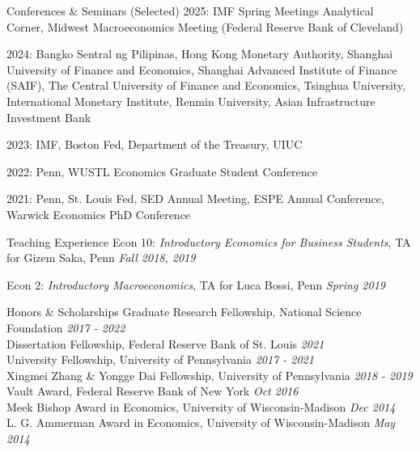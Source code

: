 \documentclass{resume}
\begin{document}
\begin{rSection}{Conferences \& Seminars (Selected)}
2025: IMF Spring Meetings Analytical Corner, Midwest Macroeconomics Meeting (Federal Reserve Bank of Cleveland)

2024: Bangko Sentral ng Pilipinas, Hong Kong Monetary Authority, Shanghai University of Finance and Economics, Shanghai Advanced Institute of Finance (SAIF), The Central University of Finance and Economics, Tsinghua University, International Monetary Institute, Renmin University, Asian Infrastructure Investment Bank

2023: IMF, Boston Fed, Department of the Treasury, UIUC

2022: Penn, WUSTL Economics Graduate Student Conference

2021: Penn, St. Louis Fed, SED Annual Meeting, ESPE Annual Conference, Warwick Economics PhD Conference
\end{rSection}

\begin{rSection}{Teaching Experience}
Econ 10: \textit{Introductory Economics for Business Students}, TA for Gizem Saka, Penn \hfill {\em Fall 2018, 2019}

Econ 2: \textit{Introductory Macroeconomics}, TA for Luca Bossi, Penn \hfill {\em Spring 2019}
\end{rSection}

\begin{rSection}{Honors \& Scholarships}
Graduate Research Fellowship, National Science Foundation \hfill {\em 2017 - 2022} \\[2pt]
Dissertation Fellowship, Federal Reserve Bank of St. Louis \hfill {\em 2021} \\[2pt]
University Fellowship, University of Pennsylvania \hfill {\em 2017 - 2021} \\[2pt]
Xingmei Zhang \& Yongge Dai Fellowship, University of Pennsylvania \hfill {\em 2018 - 2019} \\[2pt]
Vault Award, Federal Reserve Bank of New York \hfill {\em Oct 2016} \\[2pt]
Meek Bishop Award in Economics, University of Wisconsin-Madison \hfill {\em Dec 2014} \\[2pt]
L. G. Ammerman Award in Economics, University of Wisconsin-Madison \hfill {\em May 2014}
\end{rSection}
\end{document}

